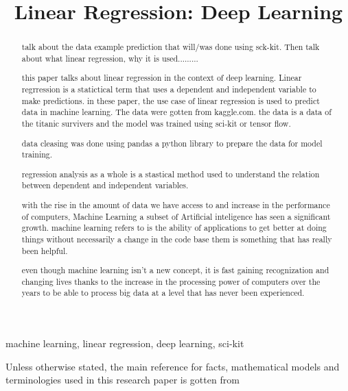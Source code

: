\documentclass[conference]{IEEEtran}
\begin{document}
\title{Linear Regression: Deep Learning}

\author{
}

\maketitle

\begin{abstract}
talk about the data example prediction that will/was done using sck-kit.  Then talk about what linear regression, why it is used......... 

this paper talks about linear regression in the context of deep learning. Linear regrression is a statictical term that uses a dependent and independent variable to make predictions. in these paper, the use case of linear regression is used to predict data in machine learning. The data were gotten from kaggle.com. the data is a data of the titanic survivers and the model was trained using sci-kit or tensor flow.

data cleasing was done using pandas a python library to prepare the data for model training.

regression analysis as a whole is a stastical method used to understand the relation between dependent and independent variables.


with the rise in the amount of data we have access to and increase in the performance of computers, Machine Learning a subset of Artificial inteligence has seen a significant growth. machine learning refers to  is the ability of applications to get better at doing things without necessarily a change in the code base them is something that has really been helpful. 

even though machine learning isn't a new concept, it is fast gaining recognization and changing lives thanks to the increase in the processing power of computers over the years to be able to process big data at a level that has never been experienced.


\end{abstract}
\begin{IEEEkeywords}
machine learning, linear regression, deep learning, sci-kit
\end{IEEEkeywords}
Unless otherwise stated, the main reference for facts, mathematical models and terminologies used in this research paper is gotten from \cite{massaron2016regression}
\end{document}
